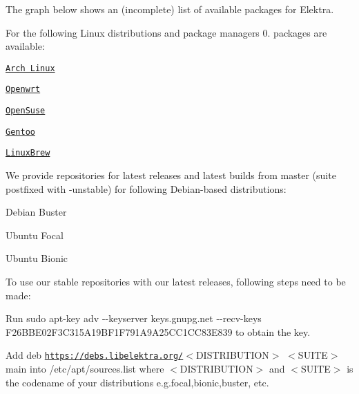 The graph below shows an (incomplete) list of available packages for Elektra.

\href{https://repology.org/metapackage/elektra/versions}{\tt }

For the following Linux distributions and package managers 0. packages are available\+:


\begin{DoxyItemize}
\item \href{https://aur.archlinux.org/packages/elektra/}{\tt Arch Linux}
\item \href{https://github.com/openwrt/packages/tree/master/libs/elektra}{\tt Openwrt}
\item \href{https://software.opensuse.org/package/elektra}{\tt Open\+Suse}
\item \href{http://packages.gentoo.org/package/app-admin/elektra}{\tt Gentoo}
\item \href{https://github.com/Linuxbrew/homebrew-core/blob/master/Formula/elektra.rb}{\tt Linux\+Brew}
\end{DoxyItemize}

We provide repositories for latest releases and latest builds from master (suite postfixed with {\ttfamily -\/unstable}) for following Debian-\/based distributions\+:


\begin{DoxyItemize}
\item Debian Buster
\item Ubuntu Focal
\item Ubuntu Bionic
\end{DoxyItemize}

To use our stable repositories with our latest releases, following steps need to be made\+:


\begin{DoxyEnumerate}
\item Run {\ttfamily sudo apt-\/key adv -\/-\/keyserver keys.\+gnupg.\+net -\/-\/recv-\/keys F26\+B\+B\+E02\+F3\+C315\+A19\+B\+F1\+F791\+A9\+A25\+C\+C1\+C\+C83\+E839} to obtain the key.
\item Add {\ttfamily deb \href{https://debs.libelektra.org/}{\tt https\+://debs.\+libelektra.\+org/}$<$D\+I\+S\+T\+R\+I\+B\+U\+T\+I\+ON$>$ $<$S\+U\+I\+TE$>$ main} into {\ttfamily /etc/apt/sources.list} where {\ttfamily $<$D\+I\+S\+T\+R\+I\+B\+U\+T\+I\+ON$>$} and {\ttfamily $<$S\+U\+I\+TE$>$} is the codename of your distributions e.\+g.{\ttfamily focal},{\ttfamily bionic},{\ttfamily buster}, etc.
\end{DoxyEnumerate}

